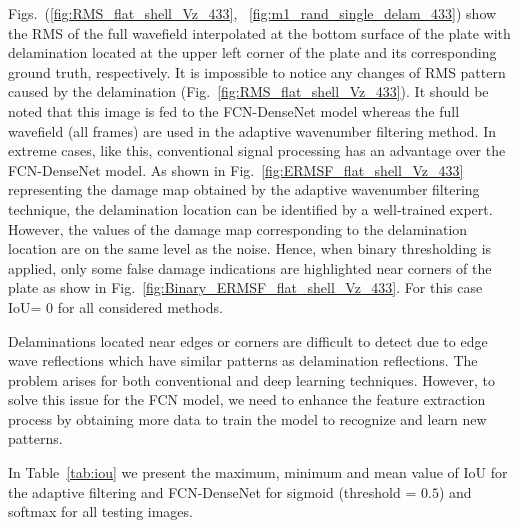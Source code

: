Figs.~(\ref{fig:RMS_flat_shell_Vz_433}, ~\ref{fig:m1_rand_single_delam_433}) show the RMS of the full wavefield interpolated at the bottom surface of the plate with delamination located at the upper left corner of the plate and its corresponding ground truth, respectively.
It is impossible to notice any changes of RMS pattern caused by the delamination (Fig.~\ref{fig:RMS_flat_shell_Vz_433}).
It should be noted that this image is fed to the FCN-DenseNet model whereas the full wavefield (all frames) are used in the adaptive wavenumber filtering method.
In extreme cases, like this, conventional signal processing has an advantage over the FCN-DenseNet model.
As shown in Fig.~\ref{fig:ERMSF_flat_shell_Vz_433} representing the damage map obtained by the adaptive wavenumber filtering technique, the delamination location can be identified by a well-trained expert. 
However, the values of the damage map corresponding to the delamination location are on the same level as the noise.
Hence, when binary thresholding is applied, only some false damage indications are highlighted near corners of the plate as show in Fig.~\ref{fig:Binary_ERMSF_flat_shell_Vz_433}. 
For this case IoU= \(0\) for all considered methods.
 
Delaminations located near edges or corners are difficult to detect due to edge wave reflections which have similar patterns as delamination reflections. 
The problem arises for both conventional and deep learning techniques. 
However, to solve this issue for the FCN model, we need to enhance the feature extraction process by obtaining more data to train the model to recognize and learn new patterns.	

In Table~\ref{tab:iou} we present the maximum, minimum and mean value of IoU for the adaptive filtering and FCN-DenseNet for sigmoid (threshold = \(0.5\)) and softmax for all testing images.
	\begin{table}
	 \renewcommand{\arraystretch}{1.3}
		\centering
		\caption{IoU for all models}
		\label{tab:iou}
	\end{table}
	
